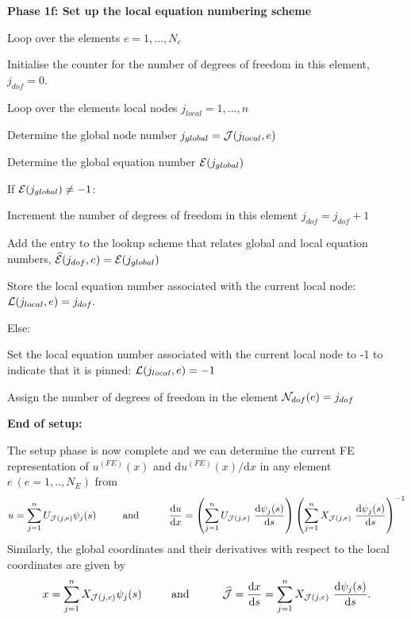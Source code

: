 \begin{DoxyItemize}
{\bfseries  Phase 1f\+: Set up the local equation numbering scheme}
\item Loop over the elements $ e=1,...,N_e $
\begin{DoxyItemize}
\item Initialise the counter for the number of degrees of freedom in this element, $ j_{dof}=0 $.
\item Loop over the element\textquotesingle{}s local nodes $ j_{local}=1,...,n$
\begin{DoxyItemize}
\item Determine the global node number $ j_{global} = {\cal J}(j_{local},e) $
\item Determine the global equation number ${\cal E}(j_{global})$
\item If ${\cal E}(j_{global}) \ne -1$\+:
\begin{DoxyItemize}
\item Increment the number of degrees of freedom in this element $ j_{dof}=j_{dof}+1$
\item Add the entry to the lookup scheme that relates global and local equation numbers, $ \widehat{\cal E}(j_{dof},e) = {\cal E}(j_{global})$
\item Store the local equation number associated with the current local node\+: $ {\cal L}(j_{local},e)=j_{dof}.$
\end{DoxyItemize}
\item Else\+:
\begin{DoxyItemize}
\item Set the local equation number associated with the current local node to -\/1 to indicate that it is pinned\+: $ {\cal L}(j_{local},e)=-1$
\end{DoxyItemize}
\end{DoxyItemize}
\item Assign the number of degrees of freedom in the element $ {\cal N}_{dof}(e)=j_{dof} $
\end{DoxyItemize}

{\bfseries  End of setup\+:}

The setup phase is now complete and we can determine the current FE representation of $ u^{(FE)}(x)$ and $ \mbox{d} u^{(FE)}(x)/\mbox{d} x$ in any element $e \ (e=1,..,N_E) $ from \[ u = \sum_{j=1}^{n} U_{{\cal J}(j,e)} \psi_j(s) \mbox{\ \ \ \ \ \ \ \ and \ \ \ \ \ \ \ \ } \frac{\mbox{d} u}{\mbox{d} x} = \left(\sum_{j=1}^n U_{{\cal J}(j,e)} \ \frac{\mbox{d} \psi_j(s)}{\mbox{d} s} \right) \left(\sum_{j=1}^n X_{{\cal J}(j,e)} \ \frac{\mbox{d} \psi_j(s)}{\mbox{d} s} \right)^{-1} \] Similarly, the global coordinates and their derivatives with respect to the local coordinates are given by \[ x = \sum_{j=1}^{n} X_{{\cal J}(j,e)} \psi_j(s) \mbox{\ \ \ \ \ \ \ \ and \ \ \ \ \ \ \ \ } \widehat{\cal J} = \frac{\mbox{d} x}{\mbox{d} s} = \sum_{j=1}^n X_{{\cal J}(j,e)} \ \frac{\mbox{d} \psi_j(s)}{\mbox{d} s}. \]


\end{DoxyItemize}
